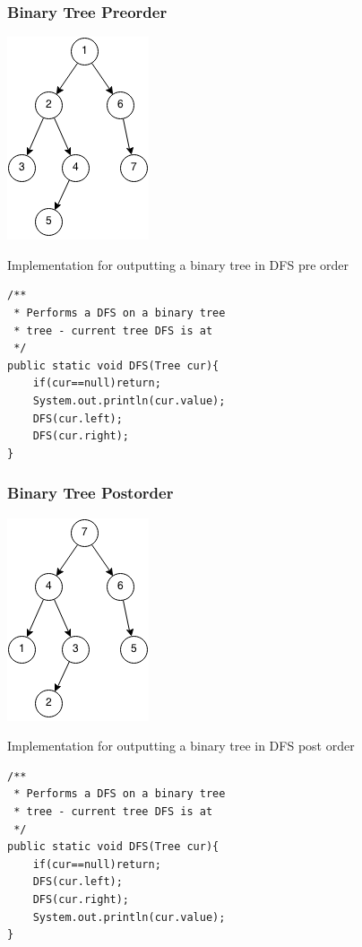 \documentclass[11pt,oneside]{book}
\makeatletter
\def\maxwidth#1{\ifdim\Gin@nat@width>#1 #1\else\Gin@nat@width\fi}
\makeatother
\begin{document}
\subsubsection{Binary Tree Preorder}

\includegraphics[width=\maxwidth{\textwidth}]{dfs-preorder.png}

Implementation for outputting a binary tree in DFS pre order

\begin{lstlisting}
/**
 * Performs a DFS on a binary tree
 * tree - current tree DFS is at
 */
public static void DFS(Tree cur){
    if(cur==null)return;
    System.out.println(cur.value);
    DFS(cur.left);
    DFS(cur.right);
}
\end{lstlisting}

\subsubsection{Binary Tree Postorder}

\includegraphics[width=\maxwidth{\textwidth}]{dfs-postorder.png}

Implementation for outputting a binary tree in DFS post order

\begin{lstlisting}
/**
 * Performs a DFS on a binary tree
 * tree - current tree DFS is at
 */
public static void DFS(Tree cur){
    if(cur==null)return;
    DFS(cur.left);
    DFS(cur.right);
    System.out.println(cur.value);
}
\end{lstlisting}
\end{document}
